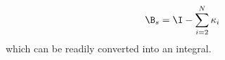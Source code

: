 \begin{equation}
  \B_s = \I - \sum\limits^{N}_{i=2} \kappa_i
\end{equation}
which can be readily converted into an integral.
  